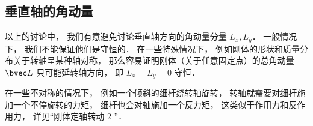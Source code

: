 \subsection{垂直轴的角动量}
以上的讨论中， 我们有意避免讨论垂直轴方向的角动量分量 $L_x, L_y$． 一般情况下， 我们不能保证他们是守恒的． 在一些特殊情况下， 例如刚体的形状和质量分布关于转轴呈某种轴对称， 那么容易证明刚体（关于任意固定点）的总角动量 $\bvec L$ 只可能延转轴方向， 即 $L_x = L_y = 0$ 守恒． %

在一些不对称的情况下， 例如一个倾斜的细杆绕转轴旋转， %
转轴就需要对细杆施加一个不停旋转的力矩， 细杆也会对轴施加一个反力矩， 这类似于作用力和反作用力， 详见“刚体定轴转动 2 ”．

